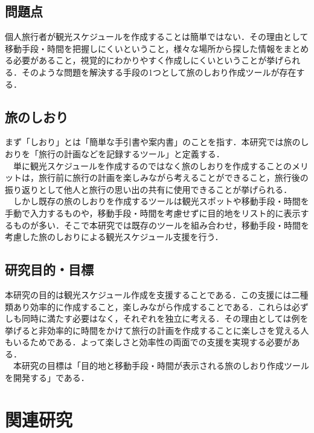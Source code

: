 \documentclass{funthesis}
\begin{document}
\section{問題点} %

個人旅行者が観光スケジュールを作成することは簡単ではない．その理由として移動手段・時間を把握しにくいということ，様々な場所から探した情報をまとめる必要があること，視覚的にわかりやすく作成しにくいということが挙げられる．そのような問題を解決する手段の1つとして旅のしおり作成ツールが存在する．\\



\section{旅のしおり}
まず「しおり」とは「簡単な手引書や案内書」のことを指す．本研究では旅のしおりを「旅行の計画などを記録するツール」と定義する．\\
　単に観光スケジュールを作成するのではなく旅のしおりを作成することのメリットは，旅行前に旅行の計画を楽しみながら考えることができること，旅行後の振り返りとして他人と旅行の思い出の共有に使用できることが挙げられる．\\
　しかし既存の旅のしおりを作成するツールは観光スポットや移動手段・時間を手動で入力するものや，移動手段・時間を考慮せずに目的地をリスト的に表示するものが多い．そこで本研究では既存のツールを組み合わせ，移動手段・時間を考慮した旅のしおりによる観光スケジュール支援を行う．


\section{研究目的・目標}

本研究の目的は観光スケジュール作成を支援することである．この支援には二種類あり効率的に作成すること，楽しみながら作成することである．これらは必ずしも同時に満たす必要はなく，それぞれを独立に考える．その理由としては例を挙げると非効率的に時間をかけて旅行の計画を作成することに楽しさを覚える人もいるためである．よって楽しさと効率性の両面での支援を実現する必要がある．\\
　本研究の目標は「目的地と移動手段・時間が表示される旅のしおり作成ツールを開発する」である．%


\chapter{関連研究}%
\end{document}
